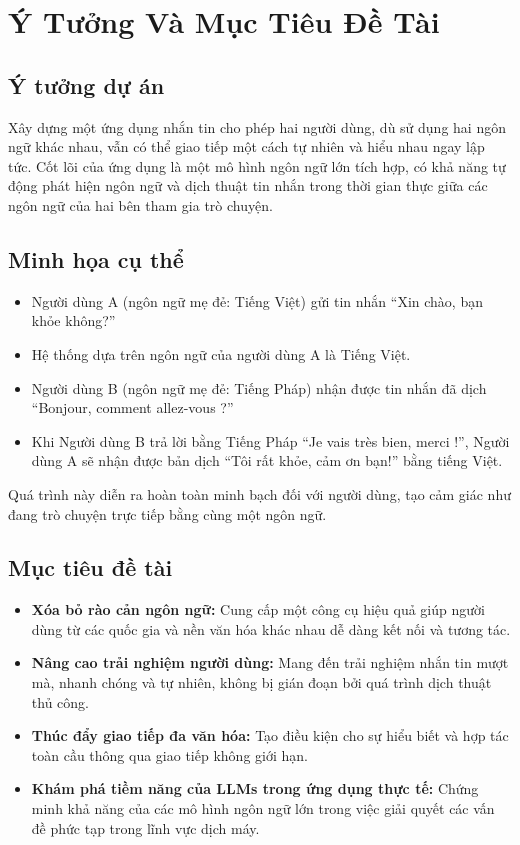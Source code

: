 \section{Ý Tưởng Và Mục Tiêu Đề Tài}

\subsection{Ý tưởng dự án}
Xây dựng một ứng dụng nhắn tin cho phép hai người dùng, dù sử dụng hai ngôn ngữ khác nhau, vẫn có thể giao tiếp một cách tự nhiên và hiểu nhau ngay lập tức. Cốt lõi của ứng dụng là một mô hình ngôn ngữ lớn tích hợp, có khả năng tự động phát hiện ngôn ngữ và dịch thuật tin nhắn trong thời gian thực giữa các ngôn ngữ của hai bên tham gia trò chuyện.

\subsection{Minh họa cụ thể}
\begin{itemize}
    \item Người dùng A (ngôn ngữ mẹ đẻ: Tiếng Việt) gửi tin nhắn ``Xin chào, bạn khỏe không?''
    \item Hệ thống dựa trên ngôn ngữ của người dùng A là Tiếng Việt.
    \item Người dùng B (ngôn ngữ mẹ đẻ: Tiếng Pháp) nhận được tin nhắn đã dịch ``Bonjour, comment allez-vous ?''
    \item Khi Người dùng B trả lời bằng Tiếng Pháp ``Je vais très bien, merci !'', Người dùng A sẽ nhận được bản dịch ``Tôi rất khỏe, cảm ơn bạn!'' bằng tiếng Việt.
\end{itemize}
Quá trình này diễn ra hoàn toàn minh bạch đối với người dùng, tạo cảm giác như đang trò chuyện trực tiếp bằng cùng một ngôn ngữ.

\subsection{Mục tiêu đề tài}
\begin{itemize}
    \item \textbf{Xóa bỏ rào cản ngôn ngữ:} Cung cấp một công cụ hiệu quả giúp người dùng từ các quốc gia và nền văn hóa khác nhau dễ dàng kết nối và tương tác.
    \item \textbf{Nâng cao trải nghiệm người dùng:} Mang đến trải nghiệm nhắn tin mượt mà, nhanh chóng và tự nhiên, không bị gián đoạn bởi quá trình dịch thuật thủ công.
    \item \textbf{Thúc đẩy giao tiếp đa văn hóa:} Tạo điều kiện cho sự hiểu biết và hợp tác toàn cầu thông qua giao tiếp không giới hạn.
    \item \textbf{Khám phá tiềm năng của LLMs trong ứng dụng thực tế:} Chứng minh khả năng của các mô hình ngôn ngữ lớn trong việc giải quyết các vấn đề phức tạp trong lĩnh vực dịch máy.
\end{itemize}